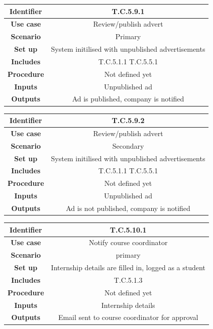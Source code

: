 \documentclass{l3deliverable}
\begin{document}
\begin{tabular}{|c|c|}
\hline \textbf{Identifier} & T.C.5.9.1\\
\hline \textbf{Use case} & Review/publish advert\\
\hline \textbf{Scenario} & Primary\\
\hline \textbf{Set up} & System initilised with unpublished advertisements\\
\hline \textbf{Includes} & T.C.5.1.1 T.C.5.5.1\\
\hline \textbf{Procedure} & Not defined yet\\
\hline \textbf{Inputs} & Unpublished ad\\
\hline \textbf{Outputs} & Ad is published, company is notified\\
\hline
\end{tabular}

\begin{tabular}{|c|c|}
\hline \textbf{Identifier} & T.C.5.9.2\\
\hline \textbf{Use case} & Review/publish advert\\
\hline \textbf{Scenario} & Secondary\\
\hline \textbf{Set up} & System initilised with unpublished advertisements\\
\hline \textbf{Includes} & T.C.5.1.1 T.C.5.5.1\\
\hline \textbf{Procedure} & Not defined yet\\
\hline \textbf{Inputs} & Unpublished ad\\
\hline \textbf{Outputs} & Ad is not published, company is notified\\
\hline
\end{tabular}

\begin{tabular}{|c|c|}
\hline \textbf{Identifier} & T.C.5.10.1\\
\hline \textbf{Use case} & Notify course coordinator\\
\hline \textbf{Scenario} & primary\\
\hline \textbf{Set up} & Internship details are filled in, logged as a student\\
\hline \textbf{Includes} & T.C.5.1.3\\
\hline \textbf{Procedure} & Not defined yet\\
\hline \textbf{Inputs} & Internship details\\
\hline \textbf{Outputs} & Email sent to course coordinator for approval\\
\hline
\end{tabular}
\end{document}
